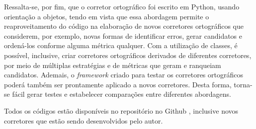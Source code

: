 \documentclass{textolivre}
\begin{document}

Ressalta-se, por fim, que o corretor 
ortográfico foi escrito em Python, usando orientação a objetos,
tendo em vista que essa abordagem 
permite o reaproveitamento do código na elaboração de novos corretores ortográficos que considerem, por
exemplo, novas formas de identificar erros, gerar candidatos e ordená-los conforme
alguma métrica qualquer. Com a utilização de classes, é possível,
inclusive, criar corretores ortográficos
derivados de diferentes corretores, por
meio de múltiplas estratégias e de
métricas que geram 
e ranqueiam candidatos. Ademais,
o \textit{framework} criado para testar os corretores ortográficos poderá também
ser prontamente 
aplicado a novos corretores. Desta forma, torna-se fácil gerar testes e estabelecer comparações entre
diferentes abordagens.

Todos os códigos estão disponíveis no repositório no Github \cite{leolcaspell}, inclusive novos corretores que estão sendo
desenvolvidos pelo autor.


\printbibliography\label{sec-bib}
\end{document}

